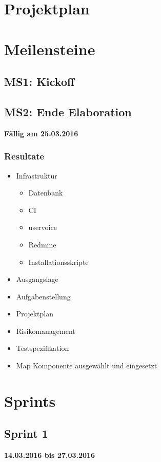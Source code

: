 \section{Projektplan}

\section{Meilensteine}
\subsection{MS1: Kickoff}

\subsection{MS2: Ende Elaboration}
\label{pm-ms2}
\textbf{Fällig am 25.03.2016}
\subsubsection{Resultate}
\begin{itemize}
	\item Infrastruktur
	\begin{itemize}
		\item Datenbank
		\item CI
		\item uservoice
		\item Redmine
		\item Installationsskripte
	\end{itemize}
	\item Ausgangslage
	\item Aufgabenstellung
	\item Projektplan
	\item Risikomanagement
	\item Testspezifikation
	\item Map Komponente ausgewählt und eingesetzt
	
\end{itemize}

\section{Sprints}
\subsection{Sprint 1}
\textbf{14.03.2016 bis 27.03.2016}

